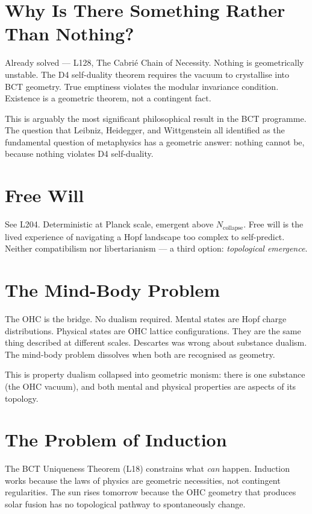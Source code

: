 \documentclass[aps,prl,twocolumn,superscriptaddress]{revtex4-2}
\begin{document}
\section{Why Is There Something Rather Than Nothing?}

Already solved --- L128, The Cabri\'e Chain of Necessity. Nothing is geometrically unstable. The D4 self-duality theorem requires the vacuum to crystallise into BCT geometry. True emptiness violates the modular invariance condition. Existence is a geometric theorem, not a contingent fact.

This is arguably the most significant philosophical result in the BCT programme. The question that Leibniz, Heidegger, and Wittgenstein all identified as the fundamental question of metaphysics has a geometric answer: nothing cannot be, because nothing violates D4 self-duality.

\section{Free Will}

See L204. Deterministic at Planck scale, emergent above $N_{\mathrm{collapse}}$. Free will is the lived experience of navigating a Hopf landscape too complex to self-predict. Neither compatibilism nor libertarianism --- a third option: \emph{topological emergence}.

\section{The Mind-Body Problem}

The OHC is the bridge. No dualism required. Mental states are Hopf charge distributions. Physical states are OHC lattice configurations. They are the same thing described at different scales. Descartes was wrong about substance dualism. The mind-body problem dissolves when both are recognised as geometry.

This is property dualism collapsed into geometric monism: there is one substance (the OHC vacuum), and both mental and physical properties are aspects of its topology.

\section{The Problem of Induction}

The BCT Uniqueness Theorem (L18) constrains what \emph{can} happen. Induction works because the laws of physics are geometric necessities, not contingent regularities. The sun rises tomorrow because the OHC geometry that produces solar fusion has no topological pathway to spontaneously change.
\end{document}
